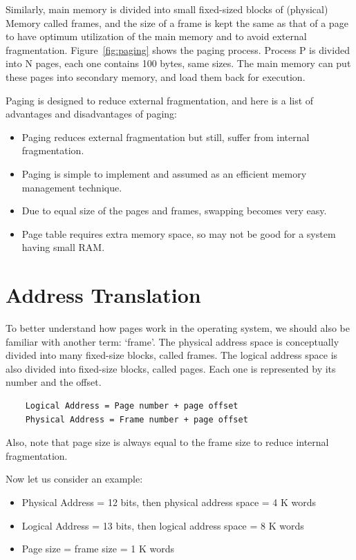 \documentclass[doc,natbib,12pt]{apa6}
\begin{document}
	Similarly, main memory is divided into small fixed-sized blocks of (physical)
	Memory called frames, and the size of a frame is kept the same as that of a
	page to have optimum utilization of the main memory and to avoid external
	fragmentation. Figure~\vref{fig:paging} shows the paging process. Process P is divided into N pages, each one contains 100 bytes, same sizes. The main memory can put these pages into secondary memory, and load them back for execution.
	
	Paging is designed to reduce external fragmentation, and here is a list of advantages and disadvantages of paging:
	\begin{itemize}
		\item Paging reduces external fragmentation but still, suffer from internal fragmentation.
		\item Paging is simple to implement and assumed as an efficient memory management technique.
		\item Due to equal size of the pages and frames, swapping becomes very easy.
		\item Page table requires extra memory space, so may not be good for a
		system having small RAM.
	\end{itemize}
	
	
	\newpage
	\section{Address Translation} \label{chp:addressTranslation}
	To better understand how pages work in the operating system, we should also be familiar with another term: `frame'. The physical address space is conceptually divided into many fixed-size blocks, called frames. The logical address space is also divided into fixed-size blocks, called pages. Each one is represented by its number and the offset.
	
	\begin{verbatim}
	Logical Address = Page number + page offset
	Physical Address = Frame number + page offset
	\end{verbatim}
	
	Also, note that page size is always equal to the frame size to reduce internal fragmentation.
	
	Now let us consider an example:
	
	\begin{itemize}
		\item Physical Address = 12 bits, then physical address space = 4 K words
		\item Logical Address = 13 bits, then logical address space = 8 K words
		\item Page size = frame size = 1 K words
	\end{itemize}
	
\end{document}
